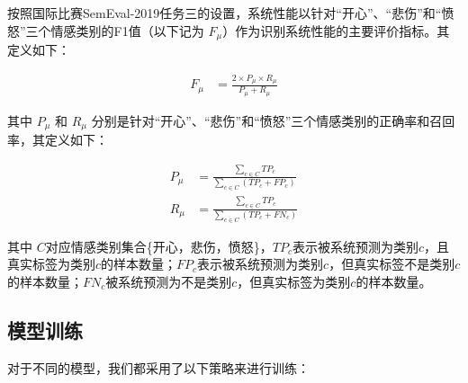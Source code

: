 按照国际比赛SemEval-2019任务三的设置，系统性能以针对“开心”、“悲伤”和“愤怒”三个情感类别的F1值（以下记为 $F_\mu$）作为识别系统性能的主要评价指标。其定义如下：

\begin{align}
  F_\mu &= \frac{2 \times P_\mu \times R_\mu}{P_\mu + R_\mu}
\end{align}

其中 $P_\mu$ 和 $R_\mu$ 分别是针对“开心”、“悲伤”和“愤怒”三个情感类别的正确率和召回率，其定义如下：

\begin{align}
  P_\mu &= \frac{\sum\limits_{c \in C} TP_c}{\sum\limits_{c \in C}(TP_c + FP_c)} \\
  R_\mu &= \frac{\sum\limits_{c \in C} TP_c}{\sum\limits_{c \in C}(TP_c + FN_c)}
\end{align}

其中 $C$对应情感类别集合\{开心，悲伤，愤怒\}，$TP_c$表示被系统预测为类别$c$，且真实标签为类别$c$的样本数量；$FP_c$表示被系统预测为类别$c$，但真实标签不是类别$c$的样本数量；$FN_c$被系统预测为不是类别$c$，但真实标签为类别$c$的样本数量。 






\subsection{模型训练}
\label{ssec:exp_context_emo_model_training}

对于不同的模型，我们都采用了以下策略来进行训练：

